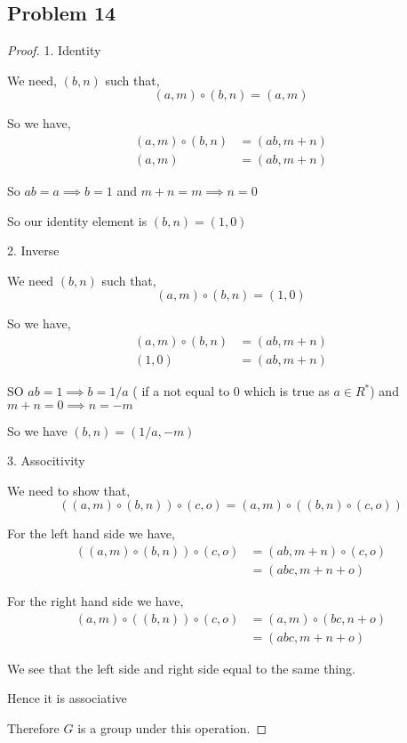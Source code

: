 \documentclass[a4paper]{report}
\begin{document}
\subsection*{Problem 14}
\begin{proof}
    1. Identity

    We need, $(b,n)$ such that, 
    $$ (a,m) \circ (b,n) = (a,m) $$ 

    So we have, 
    \begin{align*}
        (a,m) \circ (b,n) &= (ab,m + n)\\
        (a,m) &= (ab, m + n)
    \end{align*}

    So $ab = a \implies b = 1$ and  $m + n = m \implies n = 0$

    So our identity element is  $(b,n) = (1,0)$
    


    2. Inverse

    We need $(b,n)$ such that, 
    $$ (a,m) \circ (b,n) = (1,0) $$ 

    So we have, 
    \begin{align*}
        (a,m) \circ (b,n) &= (ab, m + n)\\
         (1,0) &= (ab, m + n)        
    \end{align*}

    SO $ab = 1 \implies b = 1 /a$ ( if a not equal to 0 which is true as  $a \in R^{*}$) and  $ m + n = 0 \implies n = -m$

    So we have  $(b, n) = (1 /a, -m)$




    3. Associtivity

    We need to show that, 
    $$ ((a,m) \circ (b, n) ) \circ (c, o) = (a,m) \circ ((b,n) \circ (c,o)) $$ 

    For the left hand side we have, 
    \begin{align*}
        ((a,m) \circ (b, n) ) \circ (c, o)  &= (ab, m + n) \circ (c, o)\\
                                            &= (abc, m + n + o)
    \end{align*}

    For the right hand side we have, 
    \begin{align*}
        (a,m) \circ ((b, n) ) \circ (c, o)  &= (a, m) \circ (bc, n + o)\\
                                            &= (abc, m + n + o)
    \end{align*}

    We see that the left side and right side equal to the same thing.

    Hence it is associative

    Therefore $G$ is a group under this operation.
\end{proof}
\end{document}
